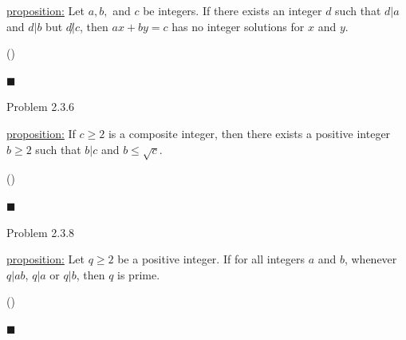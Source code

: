 \documentclass{article}
\theoremstyle{definition}
\begin{document}
	\underline{proposition:} Let $a, b,$ and $c$ be integers. If there
	exists an integer $d$ such that $d|a$ and $d|b$ but $d\not|c$, then
	$ax+by=c$ has no integer solutions for $x$ and $y$.

	\vspace{0.4cm}

	 ()

	\vspace{0.2cm}  $\blacksquare$

	\vspace{1cm}


	\noindent Problem 2.3.6  \vspace{0.3cm}

	\underline{proposition:} If $c\ge 2$ is a composite integer,
	then there exists a positive integer $b\ge 2$ such that $b|c$ and $b\le
	\sqrt{c}$.

	\vspace{0.3cm}

	 ()

	\vspace{0.2cm}

	$\blacksquare$

	\vspace{1cm}




	\noindent Problem 2.3.8  \vspace{0.3cm}

	\underline{proposition:} Let $q\ge 2$ be a positive integer. If for
	all integers $a$ and $b$, whenever $q|ab$, $q|a$ or $q|b$, then $q$
	is prime.

	\vspace{0.4cm}

	 ()

	\vspace{0.2cm}

	$\blacksquare$
\end{document}
